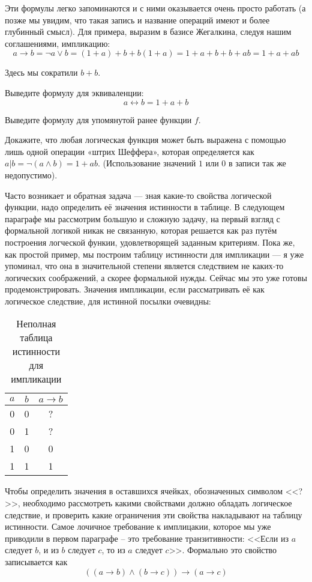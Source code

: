 Эти формулы легко запоминаются и с ними оказывается очень просто работать (а позже мы увидим, что такая запись и название операций имеют и более глубинный смысл). Для примера, выразим в базисе Жегалкина, следуя нашим соглашениями, импликацию: $$a \rightarrow b = \neg a \vee b = (1 + a) + b + b(1 + a) = 1 + a + b + b + ab = 1 + a + ab$$

Здесь мы сократили $b+b$.

\begin{exercise} Выведите формулу для эквиваленции: $$a \leftrightarrow b = 1 + a + b$$\end{exercise}

\begin{exercise} Выведите формулу для упомянутой ранее функции $f$.\end{exercise}

\begin{exercise} Докажите, что любая логическая функция может быть выражена с помощью лишь одной операции «штрих Шеффера», которая определяется как $a|b = \neg(a\wedge b) = 1 + ab$. (Использование значений $1$ или $0$ в записи так же недопустимо).\end{exercise}

Часто возникает и обратная задача --- зная какие-то свойства логической функции, надо определить её значения истинности в таблице. В следующем параграфе мы рассмотрим большую и сложную задачу, на первый взгляд с формальной логикой никак не связанную, которая решается как раз путём построения логческой функии, удовлетворящей заданным критериям. Пока же, как простой пример, мы построим таблицу истинности для импликации --- я уже упоминал, что она в значительной степени является следствием не каких-то логических соображений, а скорее формальной нужды. Сейчас мы это уже готовы продемонстрировать. Значения импликации, если рассматривать её как логическое следствие, для истинной посылки очевидны:

\begin{table}[h]
\centering
\begin{tabular}{cc|c}
$a$ & $b$ & $a \to b$ \\
\hline
0 & 0 & ? \\
0 & 1 & ? \\
1 & 0 & 0 \\
1 & 1 & 1
\end{tabular}
\caption{Неполная таблица истинности для импликации}
\end{table}

Чтобы определить значения в оставшихся ячейках, обозначенных символом <<?>>, необходимо рассмотреть какими свойствами должно обладать логическое следствие, и проверить какие ограничения эти свойства накладывают на таблицу истинности. Самое лочичное требование к имплицакии, которое мы уже приводили в первом параграфе -- это требование транзитивности: <<Если из $a$ следует $b$, и из $b$ следует $c$, то из $a$ следует $c$>>. Формально это свойство записывается как $$((a\to b) \land (b \to c)) \to (a\to c) $$

